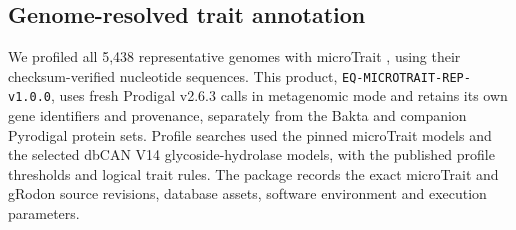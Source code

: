 \begin{revision}



\subsection{Genome-resolved trait annotation}
\label{methods:microtrait}

We profiled all 5,438 representative genomes with microTrait \cite{karaoz2022microtrait}, using their checksum-verified nucleotide sequences. This product, \texttt{EQ-MICROTRAIT-\allowbreak REP-\allowbreak v1.0.0}, uses fresh Prodigal v2.6.3 calls in metagenomic mode and retains its own gene identifiers and provenance, separately from the Bakta and companion Pyrodigal protein sets. Profile searches used the pinned microTrait models and the selected dbCAN V14 glycoside-hydrolase models, with the published profile thresholds and logical trait rules. The package records the exact microTrait and gRodon source revisions, database assets, software environment and execution parameters.


\end{revision}
